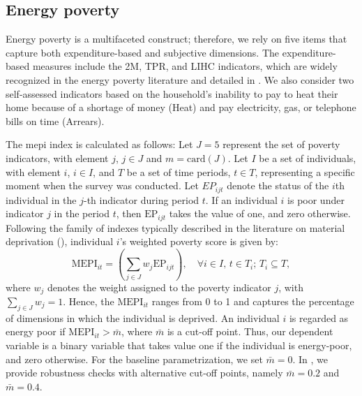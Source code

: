 \documentclass[preprint,authoryear,12pt]{elsarticle}
\newcommand{\citeTwo}[1]{(\cite{#1})}
\begin{document}
\subsection{Energy poverty} \label{Energy_poverty}

Energy poverty is a multifaceted construct; therefore, we rely on five items that capture both expenditure-based and subjective dimensions. The expenditure-based measures include the 2M, TPR, and LIHC indicators, which are widely recognized in the energy poverty literature and detailed in . We also consider two self-assessed indicators based on the household’s inability to pay to heat their home because of a shortage of money (Heat) and pay electricity, gas, or telephone bills on time (Arrears). 

The \Gls{mepi} index is calculated as follows: Let $J=5$ represent the set of poverty indicators, with element $j$, $j \in J$ and $m = \text{card}(J)$. Let $I$ be a set of individuals, with element $i$, $i \in I$, and $T$ be a set of time periods, $t \in T$, representing a specific moment when the survey was conducted. Let $EP_{ijt}$ denote the status of the $i$th individual in the $j$-th indicator during period $t$. If an individual $i$ is poor under indicator $j$ in the period $t$, then $\text{EP}_{ijt}$ takes the value of one, and zero otherwise. Following the family of indexes typically described in the literature on material deprivation \citeTwo{DPX19}, individual $i$’s weighted poverty score is given by:
\begin{equation}
\text{MEPI}_{it} = \left(\sum_{j \in J} w_j \text{EP}_{ijt}\right), \quad \forall i \in I, \, t \in T_i; \, T_i \subseteq T,
\end{equation}
where $w_j$ denotes the weight assigned to the poverty indicator $j$, with $\sum_{j \in J} w_j = 1$. Hence, the $\text{MEPI}_{it}$ ranges from 0 to 1 and captures the percentage of dimensions in which the individual is deprived. An individual $i$ is regarded as energy poor if $\text{MEPI}_{it} > \bar{m}$, where $\bar{m}$ is a cut-off point. Thus, our dependent variable is a binary variable that takes value one if the individual is energy-poor, and zero otherwise. For the baseline parametrization, we set $\bar{m} = 0$. In , we provide robustness checks with alternative cut-off points, namely $\bar{m} = 0.2$ and $\bar{m} = 0.4$.
\end{document}
